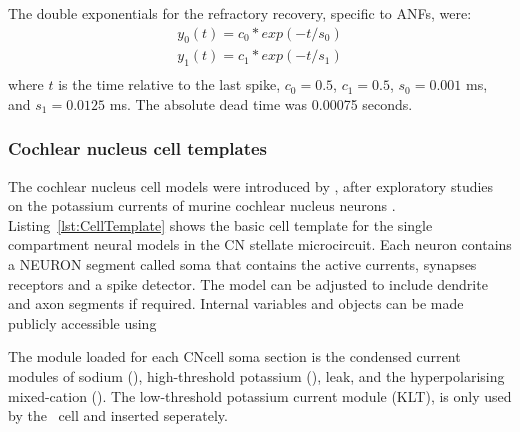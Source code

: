 The double exponentials for the refractory recovery, specific to ANFs, were:
\begin{eqnarray}
y_0(t) = c_0*exp(-t/s_0) \\
y_1(t) = c_1*exp(-t/s_1) \\
\end{eqnarray}
where $t$ is the time relative to the last spike,  $c_0 = 0.5$,   $c_1 = 0.5$, $s_0 = 0.001$ ms, and  $s_1 = 0.0125$ ms.  The absolute dead time was 0.00075 seconds.





\subsubsection[CN cells]{Cochlear nucleus cell templates    \label{sec:APDX:Cell_templates}}

The cochlear nucleus cell models were introduced by \citet{RothmanManis:2003b}, after exploratory studies on the potassium currents of murine cochlear nucleus neurons \citep{RothmanManis:2003,RothmanManis:2003a}.
Listing~\ref{lst:CellTemplate} shows the basic cell template for the single compartment neural models in the CN stellate microcircuit.
Each neuron contains a NEURON segment called soma that contains the active currents, synapses receptors and a spike detector. The model can be adjusted to include dendrite and axon segments if required.
Internal variables and objects can be made publicly accessible using

The  module loaded for each \textsf{CNcell} soma section is the condensed current modules of sodium (), high-threshold potassium (), leak, and the hyperpolarising mixed-cation ().
The low-threshold potassium current module (KLT), is only used by the \DS~cell and inserted seperately.

